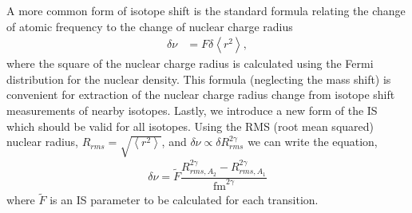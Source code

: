 \documentclass[8pt,a4paper, twoside]{report}
\begin{document}
 A more common form of isotope shift is the standard formula relating the change of atomic frequency to the change of nuclear charge radius
\begin{align} \label{eq:isoF}
\delta \nu &= F\delta \left<r^{2}\right>,
\end{align}
where the square of the nuclear charge radius is calculated using the Fermi distribution for the nuclear density. This formula (neglecting the mass shift) is convenient for extraction of the nuclear charge radius change from isotope shift measurements of nearby isotopes. Lastly, we introduce a new form of the IS which should be valid for all isotopes. Using  the RMS (root mean squared) nuclear radius, $ R_{rms} = \sqrt{\left<r^{2}\right>}$,  and $\delta \nu \propto \delta R_{rms}^{2\gamma}$ \cite{FGV2018} we can write the equation,
\begin{align}\label{eq:isoFtilde}
\delta \nu = \tilde{F}\dfrac{R_{rms,A_2}^{2\gamma} - R_{rms,A_1}^{2\gamma}}{\text{fm}^{2\gamma}}
\end{align}
where $\tilde{F}$ is an IS parameter to be calculated for each transition.
\end{document}
